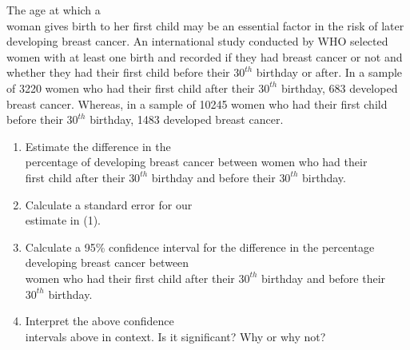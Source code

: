 \documentclass[11pt]{book}\usepackage[]{graphicx}\usepackage[]{color}
\begin{document}
\begin{exercises}
  \begin{exercise} %

The age at which a \\ woman gives birth to her first child may be an   essential factor in the risk of later \\ developing  breast cancer.  An international study conducted by WHO selected women  with at least one birth and recorded if they had breast  cancer or not and whether they had their first child before their $30^{th}$ birthday or after. In a sample of 3220 women who had their first child after their $30^{th}$ birthday, 683 developed breast cancer.  Whereas, in a sample of 10245 women who had their first child before their $30^{th}$ birthday, 1483 developed breast  cancer.

	  \begin{enumerate}
	  \item Estimate the difference in the \\ percentage of developing breast cancer  between  women who had their \\ first  child after their $30^{th}$ birthday and before their  $30^{th}$ birthday.
    \item Calculate a standard error for our \\ estimate in (1).
    \item Calculate a 95\% confidence interval for the difference in the percentage \\ developing breast cancer  between   \\ women who had their first  child after their $30^{th}$  birthday and before their \\ $30^{th}$ birthday.
    \item Interpret the above confidence \\ intervals above in context.  Is it significant? Why or why not?
	  \end{enumerate}
  \end{exercise}
  \begin{solution}  %


\end{solution}
\end{exercises}
\end{document}
